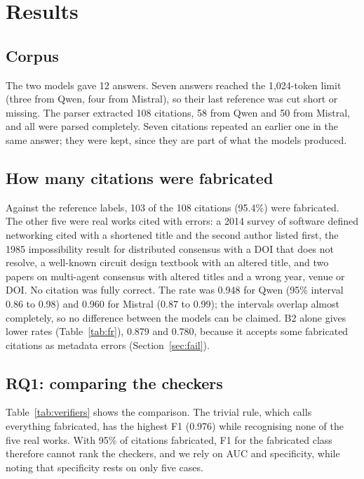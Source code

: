 \documentclass[10pt,twocolumn]{article}
\begin{document}
\section{Results}
\subsection{Corpus}
The two models gave 12 answers. Seven answers reached the 1,024-token limit (three from Qwen, four from Mistral), so their last reference was cut short or missing. The parser extracted 108 citations, 58 from Qwen and 50 from Mistral, and all were parsed completely. Seven citations repeated an earlier one in the same answer; they were kept, since they are part of what the models produced.


\subsection{How many citations were fabricated}
Against the reference labels, 103 of the 108 citations (95.4\%) were fabricated. The other five were real works cited with errors: a 2014 survey of software defined networking cited with a shortened title and the second author listed first, the 1985 impossibility result for distributed consensus with a DOI that does not resolve, a well-known circuit design textbook with an altered title, and two papers on multi-agent consensus with altered titles and a wrong year, venue or DOI. No citation was fully correct. The rate was 0.948 for Qwen (95\% interval 0.86 to 0.98) and 0.960 for Mistral (0.87 to 0.99); the intervals overlap almost completely, so no difference between the models can be claimed. B2 alone gives lower rates (Table~\ref{tab:fr}), 0.879 and 0.780, because it accepts some fabricated citations as metadata errors (Section~\ref{sec:fail}).


\subsection{RQ1: comparing the checkers}
Table~\ref{tab:verifiers} shows the comparison. The trivial rule, which calls everything fabricated, has the highest F1 (0.976) while recognising none of the five real works. With 95\% of citations fabricated, F1 for the fabricated class therefore cannot rank the checkers, and we rely on AUC and specificity, while noting that specificity rests on only five cases.
\end{document}
